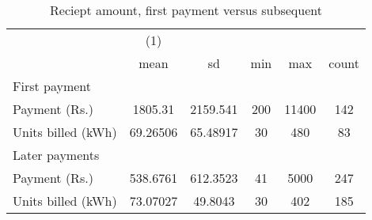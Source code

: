 \begin{table}[htbp]\centering
\def\sym#1{\ifmmode^{#1}\else\(^{#1}\)\fi}
\caption{Reciept amount, first payment versus subsequent\label {tab1}}
\begin{tabular}{l*{1}{ccccc}}
\toprule
                    &\multicolumn{1}{c}{(1)}&            &            &            &            \\
                    &        mean&          sd&         min&         max&       count\\
\midrule
First payment       &            &            &            &            &            \\
Payment (Rs.)       &     1805.31&    2159.541&         200&       11400&         142\\
Units billed (kWh)  &    69.26506&    65.48917&          30&         480&          83\\
\midrule
Later payments      &            &            &            &            &            \\
Payment (Rs.)       &    538.6761&    612.3523&          41&        5000&         247\\
Units billed (kWh)  &    73.07027&     49.8043&          30&         402&         185\\
\bottomrule
\end{tabular}
\end{table}
